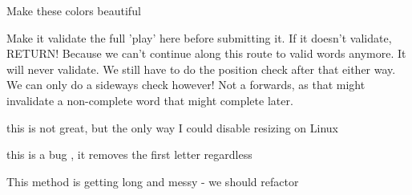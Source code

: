 
\begin{DoxyRefList}
\item[\label{todo__todo000005}%
\hypertarget{todo__todo000005}{}%
Member \hyperlink{space_8h_aa55a3024ac405580af480d91ea9f76b8}{A\-C\-T\-I\-V\-E\-C\-O\-L\-O\-R} ]Make these colors beautiful  
\item[\label{todo__todo000001}%
\hypertarget{todo__todo000001}{}%
Member \hyperlink{class_a_i_player_afdf893cf47209d106740f56c1d37c334}{A\-I\-Player\-:\-:\-\_\-assist\-\_\-ai\-\_\-search} (\hyperlink{class_trie_node}{Trie\-Node} $\ast$\-Node, Q\-List$<$ Letter $\ast$ $>$ $\ast$tiles, Q\-List$<$ Space $\ast$ $>$ $\ast$positions, Q\-List$<$ Move $\ast$ $>$ $\ast$playbuilder, list$<$ Play $\ast$ $>$ $\ast$playlist)]Make it validate the full 'play' here before submitting it. If it doesn't validate, R\-E\-T\-U\-R\-N! Because we can't continue along this route to valid words anymore. It will never validate. We still have to do the position check after that either way. We can only do a sideways check however! Not a forwards, as that might invalidate a non-\/complete word that might complete later.  
\item[\label{todo__todo000002}%
\hypertarget{todo__todo000002}{}%
Member \hyperlink{class_dialog_a0c2de1df5e1defe8e39bf30afbd63840}{Dialog\-:\-:setup\-Dialog} ()]this is not great, but the only way I could disable resizing on Linux  
\item[\label{todo__todo000003}%
\hypertarget{todo__todo000003}{}%
Member \hyperlink{class_player_a78086401345079616a422c25cb780ecb}{Player\-:\-:get\-New\-Letters} (\hyperlink{class_letter_pool}{Letter\-Pool} $\ast$)]this is a bug , it removes the first letter regardless  
\item[\label{todo__todo000004}%
\hypertarget{todo__todo000004}{}%
Member \hyperlink{class_space_a762303973d71621706a7a8195bd0f946}{Space\-:\-:on\-\_\-clicked} ()]This method is getting long and messy -\/ we should refactor 
\end{DoxyRefList}